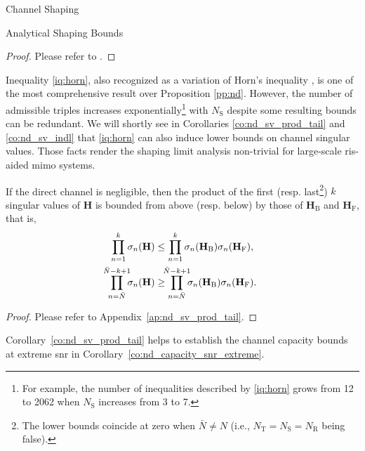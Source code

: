 \documentclass[journal]{IEEEtran}
\begin{document}
\begin{section}{Channel Shaping}
\begin{subsection}{Analytical Shaping Bounds}
		\begin{proof}
			Please refer to \cite[Theorem~8]{Fulton2000}.
		\end{proof}

		Inequality \eqref{iq:horn}, also recognized as a variation of Horn's inequality \cite{Bhatia2001}, is one of the most comprehensive result over Proposition \ref{pp:nd}.
		However, the number of admissible triples increases exponentially\footnote{For example, the number of inequalities described by \eqref{iq:horn} grows from 12 to 2062 when $N_\mathrm{S}$ increases from 3 to 7.} with $N_\mathrm{S}$ despite some resulting bounds can be redundant.
		We will shortly see in Corollaries \ref{co:nd_sv_prod_tail} and \ref{co:nd_sv_indl} that \eqref{iq:horn} can also induce lower bounds on channel singular values.
		Those facts render the shaping limit analysis non-trivial for large-scale \gls{ris}-aided \gls{mimo} systems.

		\begin{corollary}
			\label{co:nd_sv_prod_tail}
			If the direct channel is negligible,
			then the product of the first (resp. last\footnote{The lower bounds coincide at zero when $\bar{N} \ne N$ (i.e., $N_\mathrm{T} = N_\mathrm{S} = N_\mathrm{R}$ being false).}) $k$ singular values of $\mathbf{H}$ is bounded from above (resp. below) by those of $\mathbf{H}_\mathrm{B}$ and $\mathbf{H}_\mathrm{F}$, that is,
			\begin{subequations}
				\begin{align}
					\prod_{n=1}^k \sigma_n(\mathbf{H})                   & \le \prod_{n=1}^k \sigma_n(\mathbf{H}_\mathrm{B}) \sigma_n(\mathbf{H}_\mathrm{F}), \label{iq:sv_nd_prod_largest}                    \\
					\prod_{n=\bar{N}}^{\mathclap{\bar{N}-k+1}} \sigma_n(\mathbf{H}) & \ge \prod_{n=\bar{N}}^{\mathclap{\bar{N}-k+1}} \sigma_n(\mathbf{H}_\mathrm{B}) \sigma_n(\mathbf{H}_\mathrm{F}). \label{iq:sv_nd_prod_smallest}
				\end{align}
			\end{subequations}
		\end{corollary}

		\begin{proof}
			Please refer to Appendix~\ref{ap:nd_sv_prod_tail}.
		\end{proof}

		Corollary~\ref{co:nd_sv_prod_tail} helps to establish the channel capacity bounds at extreme \gls{snr} in Corollary~\ref{co:nd_capacity_snr_extreme}.


\end{subsection}
\end{section}
\end{document}
